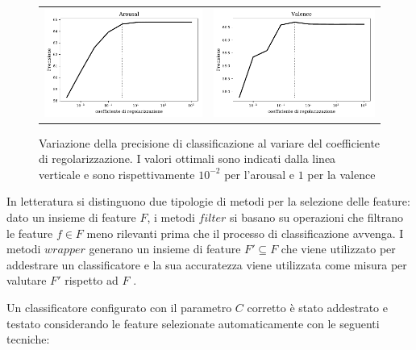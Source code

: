 \begin{figure}
\begin{tabular}{cc}
 \includegraphics[width=.45\textwidth]{img/reg_coef_aro.pdf} & \includegraphics[width=.45\textwidth]{img/reg_coef_val.pdf}
\end{tabular}
\caption{Variazione della precisione di classificazione al variare del coefficiente di regolarizzazione. I valori ottimali sono indicati dalla linea verticale e sono rispettivamente $10^{-2}$ per l'arousal e $1$ per la valence}
\label{img:regolarization_test}
\end{figure}

In letteratura si distinguono due tipologie di metodi per la selezione delle feature: dato un insieme di feature $F$, i metodi $filter$ si basano su operazioni che filtrano le feature $f \in F$ meno rilevanti prima che il processo di classificazione avvenga. I metodi $wrapper$ generano un insieme di feature $F' \subseteq F$ che viene utilizzato per addestrare un classificatore e la sua accuratezza viene utilizzata come misura per valutare $F'$ rispetto ad $F$ \cite{langley1994selection}.

Un classificatore configurato con il parametro $C$ corretto è stato addestrato e testato considerando le feature selezionate automaticamente con le seguenti tecniche:

